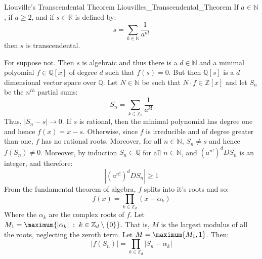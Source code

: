 \documentclass{article}                                                        %
\begin{document}
        \begin{ftheorem}{Liouville's Transcendental Theorem}
                        {Liouvilles_Transcendental_Theorem}
            If $a\in\mathbb{N}$, if $a\geq{2}$, and if $s\in\mathbb{R}$ is
            defined by:
            \begin{equation}
                s=\sum_{k\in\mathbb{N}}\frac{1}{a^{n!}}
            \end{equation}
            then $s$ is transcendental.
        \end{ftheorem}
        \begin{bproof}
            For suppose not. Then $s$ is algebraic and thus there is a
            $d\in\mathbb{N}$ and a minimal polyomial $f\in\mathbb{Q}[x]$ of
            degree $d$ such that $f(s)=0$. But then $\mathbb{Q}[s]$ is a
            $d$ dimensional vector space over $\mathbb{Q}$. Let $N\in\mathbb{N}$
            be such that $N\cdot{f}\in\mathbb{Z}[x]$ and let $S_{n}$ be the
            $n^{th}$ partial sums:
            \begin{equation}
                S_{n}=\sum_{k\in\mathbb{Z}_{n}}\frac{1}{a^{k!}}
            \end{equation}
            Thus, $|S_{n}-s|\rightarrow{0}$. If $s$ is rational, then the
            minimal polynomial has degree one and hence $f(x)=x-s$. Otherwise,
            since $f$ is irreducible and of degree greater than one, $f$ has no
            rational roots. Moreover, for all $n\in\mathbb{N}$, $S_{n}\ne{s}$
            and hence $f(S_{n})\ne{0}$. Moreover, by induction
            $S_{n}\in\mathbb{Q}$ for all $n\in\mathbb{N}$, and
            $(a^{n!})^{d}DS_{n}$ is an integer, and therefore:
            \begin{equation}
                |(a^{n!})^{d}DS_{n}|\geq{1}
            \end{equation}
            From the fundamental theorem of algebra, $f$ splits into it's roots
            and so:
            \begin{equation}
                f(x)=\prod_{k\in\mathbb{Z}_{d}}(x-\alpha_{k})
            \end{equation}
            Where the $\alpha_{k}$ are the complex roots of $f$. Let
            $M_{1}=\maximum{|\alpha_{k}|\;:\;k\in\mathbb{Z}_{d}\setminus\{0\}}$.
            That is, $M$ is the largest modulus of all the roots, neglecting the
            zeroth term. Let $M=\maximum{M_{1},1}$. Then:
            \begin{equation}
                |f(S_{n})|=\prod_{k\in\mathbb{Z}_{d}}|S_{n}-\alpha_{k}|

\end{equation}
\end{bproof}
\end{document}
